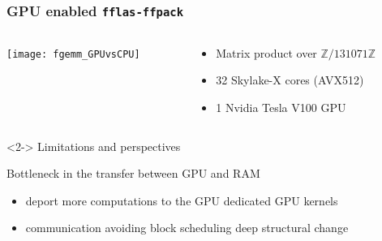 \documentclass{beamer}
\newcommand{\Z}{\ensuremath{\mathbb{Z}\xspace}}
\newcommand{\thus}{\textcolor{red}{\MVRightarrow{}}\xspace}
\begin{document}
\begin{frame}
  \frametitle{GPU enabled \texttt{fflas-ffpack}}
  \vspace{-1em}
  \begin{columns}
    \begin{column}{.62\textwidth}
      \begin{center}
        \texttt{[image: fgemm\_GPUvsCPU]}
      \end{center}
    \end{column}
    \begin{column}{.38\textwidth}
      \begin{itemize}
      \item Matrix product over $\Z/131071\Z$
      \item 32 Skylake-X cores (AVX512)
      \item 1 Nvidia Tesla V100 GPU
      \end{itemize}    
    \end{column}
  \end{columns}

      \begin{block}<2-> {Limitations and perspectives}
  \vspace{-1em}
        \begin{center}
        \alert{Bottleneck in the transfer between GPU and RAM}
        \end{center}
        \vspace{-1em}
        \begin{itemize}
        \item deport more computations to the GPU \hfill  \thus dedicated GPU kernels
        \item communication avoiding block scheduling \hfill \thus deep structural change
        \end{itemize}
      \end{block}
\end{frame}



\end{document}
